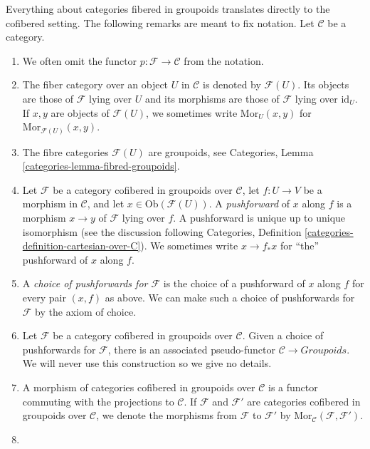 \begin{remarks}
\label{remarks-cofibered-groupoids}
Everything about categories fibered in groupoids translates directly to the 
cofibered setting. The following remarks are meant to fix notation.
Let $\mathcal{C}$ be a category.
\begin{enumerate}
\item We often omit the functor $p: \mathcal{F} \to \mathcal{C}$ from the 
notation.
\item The fiber category over an object $U$ in $\mathcal{C}$ is denoted by 
$\mathcal{F}(U)$. Its objects are those of $\mathcal{F}$ lying over $U$ and its 
morphisms are those of $\mathcal{F}$ lying over $\text{id}_{U}$.
If $x,y$  are objects of $\mathcal{F}(U)$, we sometimes write
$\text{Mor}_{U}(x,y)$ for $\text{Mor}_{\mathcal{F}(U)}(x,y)$.
\item The fibre categories $\mathcal{F}(U)$ are groupoids, see
Categories, Lemma \ref{categories-lemma-fibred-groupoids}.
\item
\label{item-pushforward}
Let $\mathcal{F}$ be a category cofibered in groupoids over
$\mathcal{C}$, let $f: U \to V$ be a morphism in $\mathcal{C}$, and
let $x \in \text{Ob}(\mathcal{F}(U))$.
A {\it pushforward} of $x$ along $f$ is a morphism 
$x \to y$ of $\mathcal{F}$ lying over $f$. A pushforward
is unique up to unique isomorphism (see the discussion following
Categories, Definition \ref{categories-definition-cartesian-over-C}).
We sometimes write $x \to f_*x$ for ``the'' pushforward of $x$
along $f$.
\item A {\it choice of pushforwards for $\mathcal{F}$} is the choice of
a pushforward of $x$ along $f$ for every pair $(x,f)$ as above. We can make
such a choice of pushforwards for $\mathcal{F}$ by the axiom of choice.
\item Let $\mathcal{F}$ be a category cofibered in groupoids over
$\mathcal{C}$. Given a choice of pushforwards for $\mathcal{F}$, there
is an associated pseudo-functor $\mathcal{C} \to \textit{Groupoids}$.
We will never use this construction so we give no details.
\item
\label{item-cofibered-morphism}
A morphism of categories cofibered in groupoids over $\mathcal{C}$ is a
functor commuting with the projections to $\mathcal{C}$. If $\mathcal{F}$
and $\mathcal{F}'$ are categories cofibered in groupoids over
$\mathcal{C}$, we denote the morphisms from $\mathcal{F}$ to $\mathcal{F}'$
by $\text{Mor}_{\mathcal{C}}(\mathcal{F}, \mathcal{F}')$.
\item 
\label{item-definition-cofibered-groupoids-2-category}

\end{enumerate}
\end{remarks}
